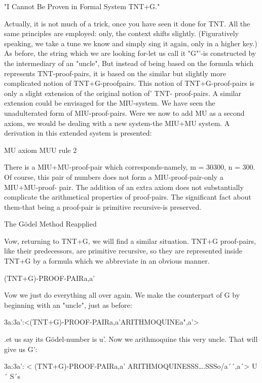                     "I Cannot Be Proven in Formal System TNT+G."

Actually, it is not much of a trick, once you have seen it done for TNT. All the same
principles are employed: only, the context shifts slightly. (Figuratively speaking, we take
a tune we know and simply sing it again, only in a higher key.) As before, the string
which we are looking for-let us call it "G"'-is constructed by the intermediary of an
"uncle", But instead of being based on the formula which represents TNT-proof-pairs, it
is based on the similar but slightly more complicated notion of TNT+G-proofpairs. This
notion of TNT+G-proof-pairs is only a slight extension of the original notion of' TNT-
proof-pairs.
        A similar extension could be envisaged for the MIU-system. We have seen the
unadulterated form of MIU-proof-pairs. Were we now to add MU as a second axiom, we
would be dealing with a new system-the MIU+MU system. A derivation in this extended
system is presented:

                              MU              axiom
                              MUU             rule 2

There is a MIU+MU-proof-pair which corresponds-namely, m = 30300, n = 300. Of
course, this pair of numbers does not form a MIU-proof-pair-only a MIU+MU-proof-
pair. The addition of an extra axiom does not substantially complicate the arithmetical
properties of proof-pairs. The significant fact about them-that being a proof-pair is
primitive recursive-is preserved.

                             The Gödel Method Reapplied

Vow, returning to TNT+G, we will find a similar situation. TNT+G proof-pairs, like
their predecessors, are primitive recursive, so they are represented inside TNT+G by a
formula which we abbreviate in an obvious manner.

                             (TNT+G)-PROOF-PAIR{a,a' }

Vow we just do everything all over again. We make the counterpart of G by beginning
with an "uncle", just as before:

         3a:3a':<(TNT+G)-PROOF-PAIR{a,a'}ARITHMOQUINE{a",a'}>

.et us say its Gödel-number is u'. Now we arithmoquine this very uncle. That will give us
G':

                        3a:3a': < (TNT+G)-PROOF-PAIR{a,a' }
                        ARITHMOQUINE{SSS….SSSo/a´´,a´}>
                                               U´ S´s



